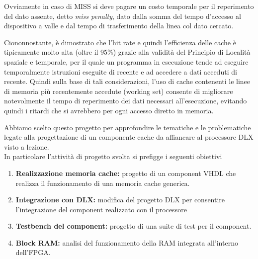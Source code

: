 Ovviamente in caso di MISS si deve pagare un costo temporale per il reperimento del dato assente, detto \emph{miss penalty}, dato dalla somma del tempo d'accesso al dispositivo a valle e dal tempo di trasferimento della linea col dato cercato.

Ciononnostante, \`e dimostrato che l'hit rate e quindi l'efficienza delle cache \`e tipicamente molto alta (oltre il 95\%) grazie alla validit\`a del Principio di Localit\`a spaziale e temporale, per il quale un programma in esecuzione tende ad eseguire temporalmente istruzioni eseguite di recente e ad accedere a dati acceduti di recente.
Quindi sulla base di tali considerazioni, l'uso di cache contenenti le linee di memoria pi\`u recentemente accedute (working set) consente di migliorare notevolmente il tempo di reperimento dei dati necessari all'esecuzione, evitando quindi i ritardi che si avrebbero per ogni accesso diretto in memoria.

Abbiamo scelto questo progetto per approfondire le tematiche e le problematiche legate alla progettazione di un componente cache da affiancare al processore DLX visto a lezione.\\

In particolare l'attivit\`a di progetto svolta si prefigge i seguenti obiettivi

\begin{enumerate}

\item \textbf{Realizzazione memoria cache:} progetto di un component VHDL che realizza il funzionamento di una memoria cache generica.

\item \textbf{Integrazione con DLX:} modifica del progetto DLX per consentire l'integrazione del component realizzato con il processore

\item \textbf{Testbench del component:} progetto di una suite di test per il component.

\item \textbf{Block RAM:} analisi del funzionamento della RAM integrata all'interno dell'FPGA.

\end{enumerate}